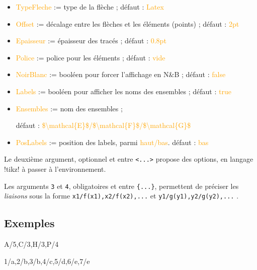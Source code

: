 \documentclass[french,a4paper,11pt]{article}
\newcommand\Cle[1]{{\small\sffamily\textlangle \textcolor{orange}{#1}\textrangle}}
\begin{document}
{{\begin{tipblock}
\begin{itemize}
	\hfill{}défaut : \Cle{teal}
	\item \Cle{TypeFleche} := type de la flèche  ; \hfill{}défaut : \Cle{Latex}
	\item \Cle{Offset} := décalage entre les flèches et les éléments (points) ; \hfill{}défaut : \Cle{2pt}
	\item \Cle{Epaisseur} := épaisseur des tracés ; \hfill{}défaut : \Cle{0.8pt}
	\item \Cle{Police} := police pour les éléments ; \hfill{}défaut : \Cle{vide}
	\item \Cle{NoirBlanc} := booléen pour forcer l'affichage en N\&{}B ; \hfill{}défaut : \Cle{false}
	\item \Cle{Labels} := booléen pour afficher les noms des ensembles ; \hfill{}défaut : \Cle{true}
	\item \Cle{Ensembles} := nom des ensembles  ;
	
	\hfill{}défaut : \Cle{\$\textbackslash mathcal\{E\}\$/\$\textbackslash  mathcal\{F\}\$/\$\textbackslash  mathcal\{G\}\$}
	\item \Cle{PosLabels} := position des labels, parmi \Cle{haut/bas}. \hfill{}défaut : \Cle{bas}
\end{itemize}

Le deuxième argument, optionnel et entre \texttt{<...>} propose des options, en langage \packagetex!tikz! à passer à l'environnement.

\smallskip

Les arguments \texttt{3} et \texttt{4}, obligatoires et entre \texttt{\{...\}}, permettent de préciser les \textit{liaisons} sous la forme \verb!x1/f(x1),x2/f(x2),...! et \verb!y1/g(y1),y2/g(y2),...! .
\end{tipblock}

\subsection{Exemples}

\begin{DemoCode}[]
%
	{A/5,C/3,H/3,P/4}%
\end{DemoCode}

\begin{DemoCode}[]
%
	{1/a,2/b,3/b,4/c,5/d,6/e,7/e}%
\end{DemoCode}

}}
\end{document}
